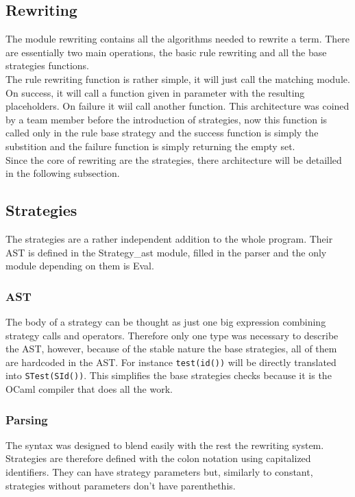 \documentclass[12pt,a4paper]{article}
\begin{document}
\subsection{Rewriting}
\label{rewriting}
The module rewriting contains all the algorithms needed to rewrite a term. There
are essentially two main operations, the basic rule rewriting and all the base
strategies functions. \\

The rule rewriting  function is rather simple, it will just call the matching module.
On success, it will call a function given in parameter with the resulting 
placeholders. On failure it wiil call another function. This architecture was coined
by a team member before the introduction of strategies, now this function is
called only in the rule base strategy and the success function is simply the 
substition and the failure function is simply returning the empty set.\\

Since the core of rewriting are the strategies, there architecture will be detailled
in the following subsection.

\subsection{Strategies}
The strategies are a rather independent addition to the whole program. Their AST is 
defined in the Strategy\_ast module, filled in the parser and the only module 
depending on them is Eval. 

\subsubsection*{AST}
The body of a strategy can be thought as just one big expression combining strategy
calls and operators. Therefore only one type was necessary to describe the AST, 
however, because of the stable nature the base strategies, all of them are 
hardcoded in the AST. For instance \verb|test(id())| will be directly translated into
\verb|STest(SId())|. This simplifies the base strategies checks because it is the 
OCaml compiler that does all the work.

\subsubsection*{Parsing}
The syntax was designed to blend easily with the rest the rewriting system. 
Strategies are therefore defined with the colon notation using capitalized 
identifiers. They can have strategy parameters but, similarly to constant, 
strategies without parameters don't have parenthethis. \\
\end{document}
